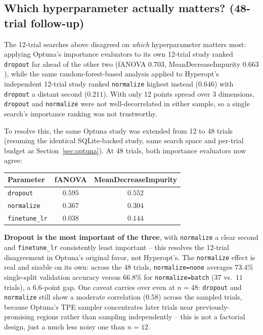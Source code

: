 \documentclass{article}
\begin{document}
\subsection{Which hyperparameter actually matters? (48-trial follow-up)}
\label{sec:importance}

The 12-trial searches above disagreed on \emph{which} hyperparameter
matters most: applying Optuna's importance evaluators to its own 12-trial
study ranked \texttt{dropout} far ahead of the other two
(fANOVA $0.703$, MeanDecreaseImpurity $0.663$), while the same
random-forest-based analysis applied to Hyperopt's independent 12-trial
study ranked \texttt{normalize} highest instead ($0.646$) with
\texttt{dropout} a distant second ($0.211$). With only 12 points spread
over 3 dimensions, \texttt{dropout} and \texttt{normalize} were not
well-decorrelated in either sample, so a single search's importance
ranking was not trustworthy.

To resolve this, the same Optuna study was extended from 12 to 48 trials
(resuming the identical SQLite-backed study, same search space and
per-trial budget as Section~\ref{sec:optuna}). At 48 trials, both
importance evaluators now agree:

\begin{center}
\begin{tabular}{lcc}
\toprule
Parameter & fANOVA & MeanDecreaseImpurity \\
\midrule
\texttt{dropout}      & $0.595$ & $0.552$ \\
\texttt{normalize}    & $0.367$ & $0.304$ \\
\texttt{finetune\_lr} & $0.038$ & $0.144$ \\
\bottomrule
\end{tabular}
\end{center}

\textbf{Dropout is the most important of the three}, with
\texttt{normalize} a clear second and \texttt{finetune\_lr} consistently
least important -- this resolves the 12-trial disagreement in Optuna's
original favor, not Hyperopt's. The \texttt{normalize} effect is real and
sizable on its own: across the 48 trials, \texttt{normalize=none} averages
$73.4\%$ single-split validation accuracy versus $66.8\%$ for
\texttt{normalize=batch} ($37$ vs.\ $11$ trials), a $6.6$-point gap. One
caveat carries over even at $n{=}48$: \texttt{dropout} and
\texttt{normalize} still show a moderate correlation ($0.58$) across the
sampled trials, because Optuna's TPE sampler concentrates later trials
near previously-promising regions rather than sampling independently --
this is not a factorial design, just a much less noisy one than $n{=}12$.
\end{document}

